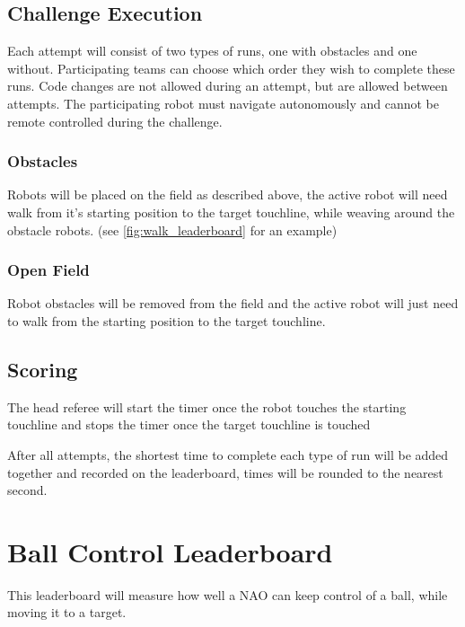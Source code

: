 \subsection{Challenge Execution}
Each attempt will consist of two types of runs, one with obstacles and one without.
Participating teams can choose which order they wish to complete these runs. Code changes are not allowed during an attempt,
but are allowed between attempts. The participating robot must navigate autonomously and cannot be remote controlled during the challenge.

\subsubsection{Obstacles}
Robots will be placed on the field as described above, the active robot will need walk from it's
starting position to the target touchline, while weaving around the obstacle robots. (see \cref{fig:walk_leaderboard} for an example)

\subsubsection{Open Field}
Robot obstacles will be removed from the field and the active robot will just need to walk 
from the starting position to the target touchline.

\subsection{Scoring}
The head referee will start the timer once the robot touches the starting touchline and stops the timer once the target touchline is touched

After all attempts, the shortest time to complete each type of run will be added together and recorded
on the leaderboard, times will be rounded to the nearest second.

\section{Ball Control Leaderboard}
This leaderboard will measure how well a NAO can keep control of a ball, while moving it
to a target.

